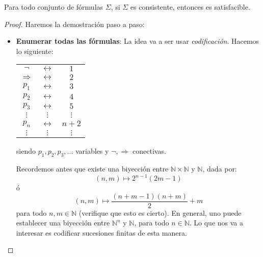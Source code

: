 \documentclass[12pt]{report}
\newcounter{it}
\theoremstyle{largebreak}
\newcounter{tablec}
\begin{document}
    \begin{lema}
        \label{demConsist}
        Para todo conjunto de fórmulas $\Sigma$, si $\Sigma$ es consistente, entonces es satisfacible.
    \end{lema}

    \begin{proof}
        Haremos la demostración paso a paso:
        \begin{itemize}
            \item \textbf{Enumerar todas las fórmulas}: La idea va a ser usar \textit{codificación}. Hacemos lo siguiente:
            \begin{center}
                \begin{tabular}{ccc}
                    $\neg$ & $\longleftrightarrow$ & $1$ \\
                    $\Rightarrow$ & $\longleftrightarrow$ & $2$ \\
                    $p_1$ & $\longleftrightarrow$ & $3$ \\
                    $p_2$ & $\longleftrightarrow$ & $4$ \\
                    $p_3$ & $\longleftrightarrow$ & $5$ \\
                    $\vdots$ & $\vdots$ & $\vdots$ \\
                    $p_n$ & $\longleftrightarrow$ & $n+2$ \\
                    $\vdots$ & $\vdots$ & $\vdots$ \\
                \end{tabular}
            \end{center}
            siendo $p_1,p_2,p_3,...$ variables y $\neg,\Rightarrow$ conectivas.

            Recordemos antes que existe una biyección entre $\mathbb{N}\times\mathbb{N}$ y $\mathbb{N}$, dada por:
            \begin{equation*}
                (n,m)\mapsto 2^{ n-1}(2m-1)
            \end{equation*}
            ó
            \begin{equation*}
                (n,m)\mapsto\frac{(n+m-1)(n+m)}{2}+m
            \end{equation*}
            para todo $n,m\in\mathbb{N}$ (verifique que esto es cierto). En general, uno puede establecer una biyección entre $\mathbb{N}^n$ y $\mathbb{N}$, para todo $n\in\mathbb{N}$. Lo que nos va a interesar es codificar sucesiones finitas de esta manera.


\end{itemize}
\end{proof}
\end{document}
